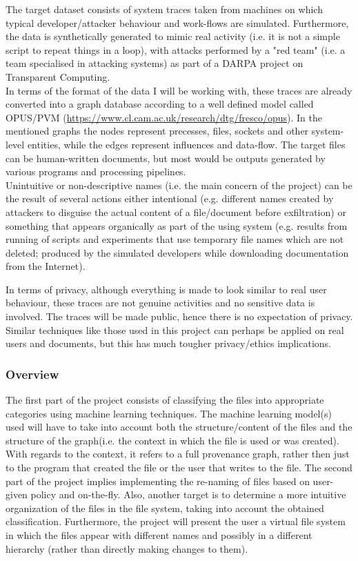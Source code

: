 The target dataset consists of system traces taken from machines on which typical developer/attacker behaviour and work-flows are simulated. Furthermore, the data is synthetically generated to mimic real activity (i.e. it is not a simple script to repeat things in a loop), with attacks performed by a "red team" (i.e. a team specialised in attacking systems) as part of a DARPA project on Transparent Computing. \\
In terms of the format of the data I will be working with, these traces are already converted into a graph database according to a well defined model called OPUS/PVM (\url{https://www.cl.cam.ac.uk/research/dtg/fresco/opus}). In the mentioned graphs the nodes represent precesses, files, sockets and other system-level entities, while the edges represent influences and data-flow. The target files can be human-written documents, but most would be outputs generated by various programs and processing pipelines. \\
Unintuitive or non-descriptive names (i.e. the main concern of the project) can be the result of several actions either intentional (e.g. different names created by attackers to disguise the actual content of a file/document before exfiltration) or something that appears organically as part of the using system (e.g. results from running of scripts and experiments that use temporary file names which are not deleted; produced by the simulated developers while downloading documentation from the Internet).

In terms of privacy, although everything is made to look similar to real user behaviour, these traces are not genuine activities and no sensitive data is involved. The traces will be made public, hence there is no expectation of privacy. Similar techniques like those used in this project can perhaps be applied on real users and documents, but this has much tougher privacy/ethics implications. \\


\subsubsection*{Overview}

The first part of the project consists of classifying the files into appropriate categories using machine learning techniques. The machine learning model(s) used will have to take into account both the structure/content of the files and the structure of the graph(i.e. the context in which the file is used or was created). With regards to the context, it refers to a full provenance graph, rather then just to the program that created the file or the user that writes to the file. The second part of the project implies implementing the re-naming of files based on user-given policy and on-the-fly. Also, another target is to determine a more intuitive organization of the files in the file system, taking into account the obtained classification. Furthermore, the project will present the user a virtual file system in which the files appear with different names and possibly in a different hierarchy (rather than directly making changes to them). \\


